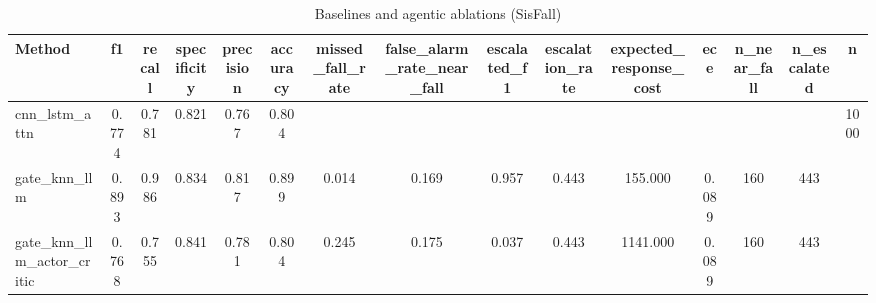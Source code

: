 \begin{table}[t]
\centering
\caption{Baselines and agentic ablations (SisFall)}
\begin{tabular}{lcccccccccccccc}
\toprule
Method & f1 & recall & specificity & precision & accuracy & missed_fall_rate & false_alarm_rate_near_fall & escalated_f1 & escalation_rate & expected_response_cost & ece & n_near_fall & n_escalated & n \\
\midrule
cnn_lstm_attn & 0.774 & 0.781 & 0.821 & 0.767 & 0.804 &  &  &  &  &  &  &  &  & 1000 \\
gate_knn_llm & 0.893 & 0.986 & 0.834 & 0.817 & 0.899 & 0.014 & 0.169 & 0.957 & 0.443 & 155.000 & 0.089 & 160 & 443 &  \\
gate_knn_llm_actor_critic & 0.768 & 0.755 & 0.841 & 0.781 & 0.804 & 0.245 & 0.175 & 0.037 & 0.443 & 1141.000 & 0.089 & 160 & 443 &  \\
\bottomrule
\end{tabular}
\end{table}
